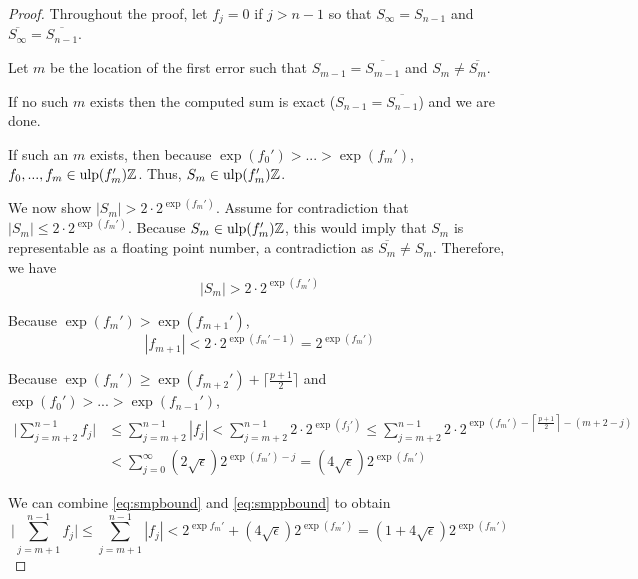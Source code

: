     \begin{proof}

      Throughout the proof, let $f_j = 0$ if $j > n - 1$ so that $S_{\infty} = S_{n - 1}$ and $\overline{S_{\infty}} = \overline{S_{n - 1}}$.

      Let $m$ be the location of the first error such that $S_{m - 1} = \overline{S_{m - 1}}$ and $S_{m} \neq \overline{S_{m}}$.

      If no such $m$ exists then the computed sum is exact ($S_{n - 1} = \overline{S_{n - 1}}$) and we are done.

      If such an $m$ exists, then because $\exp(f_0') > ... > \exp(f_m')$, $f_0, ..., f_m \in \text{ulp}(f_m')\mathbb{Z}$. Thus, $S_m \in \text{ulp}(f_m')\mathbb{Z}$.

      We now show $|S_m| > 2 \cdot 2^{\exp(f_m')}$. Assume for contradiction that $|S_m| \leq 2 \cdot 2^{\exp(f_m')}$. Because $S_m \in \text{ulp}(f_m')\mathbb{Z}$, this would imply that $S_m$ is representable as a floating point number, a contradiction as $\overline{S_m} \neq S_m$. Therefore, we have
      \begin{equation}
        |S_m| > 2 \cdot 2^{\exp(f_m')}
        \label{eq:smbound}
      \end{equation}

      Because $\exp(f_m') > \exp(f_{m + 1}')$,
      \begin{equation}
        |f_{m + 1}| < 2\cdot2^{\exp(f_m' - 1)} = 2^{\exp(f_m')}
        \label{eq:smpbound}
      \end{equation}

      Because $\exp(f_m') \geq \exp(f_{m + 2}') + \lceil\frac{p + 1}{2}\rceil$ and $\exp(f_0') > ... > \exp(f_{n - 1}')$,
      \begin{align}
        \bigl|\sum \limits_{j = m + 2}^{n - 1} f_j\bigr| &\leq \sum \limits_{j = m + 2}^{n - 1} |f_j| < \sum \limits_{j = m + 2}^{n - 1} 2 \cdot 2^{\exp(f_j')} \leq \sum \limits_{j = m + 2}^{n - 1} 2 \cdot 2^{\exp(f_m') - \left\lceil\frac{p + 1}{2}\right\rceil - (m + 2 - j)} \nonumber \\
        &< \sum \limits_{j = 0}^{\infty} \left(2 \sqrt{\epsilon}\right)2^{\exp(f_m') - j} = \left(4\sqrt\epsilon\right)2^{\exp(f_m')}
        \label{eq:smppbound}
      \end{align}

      We can combine  \eqref{eq:smpbound} and \eqref{eq:smppbound} to obtain
      \begin{equation}
        \bigl|\sum\limits_{j = m + 1}^{n - 1} f_j\bigr| \leq \sum\limits_{j = m + 1}^{n - 1} |f_j| < 2^{\exp{f_m'}} + \left(4 \sqrt{\epsilon}\right) 2^{\exp(f_m')} = \left(1 + 4 \sqrt\epsilon \right)2^{\exp(f_m')}
        \label{eq:smsbound}
      \end{equation}


\end{proof}
